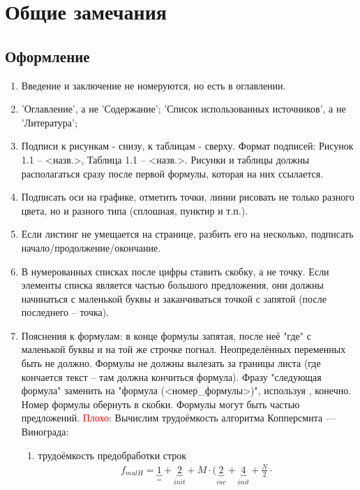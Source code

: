 \chapter{Общие замечания}

\section{Оформление}
\begin{enumerate}
	\item Введение и заключение не номеруются, но есть в оглавлении.
	\item 'Оглавление', а не 'Содержание'; 'Список использованных источников', а не 'Литература';
	\item Подписи к рисункам - снизу, к таблицам - сверху. Формат подписей: Рисунок 1.1 --  <назв.>, Таблица 1.1 -- <назв.>. Рисунки и таблицы должны располагаться сразу после первой формулы, которая на них ссылается.
	\item Подписать оси на графике, отметить точки, линии рисовать не только разного цвета, но и разного типа (сплошная, пунктир и т.п.).
	\item Если листинг не умещается на странице, разбить его на несколько, подписать начало/продолжение/окончание.
	\item В нумерованных списках после цифры ставить скобку, а не точку. Если элементы списка является частью большого предложения, они должны начинаться с маленькой буквы и заканчиваться точкой с запятой (после последнего -- точка).
	\item Пояснения к формулам: в конце формулы запятая, после неё "где" с маленькой буквы и на той же строчке погнал. Неопределённых переменных быть не должно. Формулы не должны вылезать за границы листа (где кончается текст -- там должна кончиться формула). Фразу "следующая формула" заменить на "формула (<номер\_формулы>)", используя , конечно. Номер формулы обернуть в скобки. Формулы могут быть частью предложений.\newline
	\textcolor{red}{Плохо}:\newline
	Вычислим трудоёмкость алгоритма Копперсмита — Винограда:
	\begin{enumerate}
		\item трудоёмкость предобработки строк
		\begin{equation}
			\begin{gathered}
				f_{mulH} = \underbrace{1}_{=} + \underbrace{2}_{init} + M \cdot (\underbrace{2}_{inc} + \underbrace{4}_{init} + \frac{N}{2} \cdot \\

\end{gathered}
\end{equation}
\end{enumerate}
\end{enumerate}
